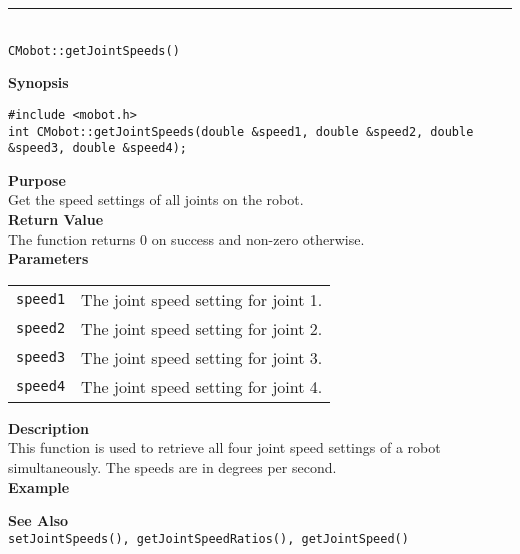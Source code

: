 \noindent
\vspace{5pt}
\rule{4.5in}{0.015in}\\
\noindent
{\LARGE \texttt{CMobot::getJointSpeeds()}}\\
{}

\noindent
{\bf Synopsis}
\vspace{-8pt}
\begin{verbatim}
#include <mobot.h>
int CMobot::getJointSpeeds(double &speed1, double &speed2, double &speed3, double &speed4);
\end{verbatim}

\noindent
{\bf Purpose}\\
Get the speed settings of all joints on the robot.\\

\noindent
{\bf Return Value}\\
The function returns 0 on success and non-zero otherwise.\\

\noindent
{\bf Parameters}
\vspace{-0.1in}
\begin{description}
\item               
\begin{tabular}{p{10 mm}p{145 mm}}
\texttt{speed1} & The joint speed setting for joint 1.\\
\texttt{speed2} & The joint speed setting for joint 2.\\
\texttt{speed3} & The joint speed setting for joint 3.\\
\texttt{speed4} & The joint speed setting for joint 4.\\
\end{tabular}
\end{description}

\noindent
{\bf Description}\\
This function is used to retrieve all four joint speed settings of a robot
simultaneously. The speeds are in degrees per second. \\

\noindent
{\bf Example}\\
\noindent

\noindent
{\bf See Also}\\
\texttt{setJointSpeeds(), getJointSpeedRatios(), getJointSpeed()}

